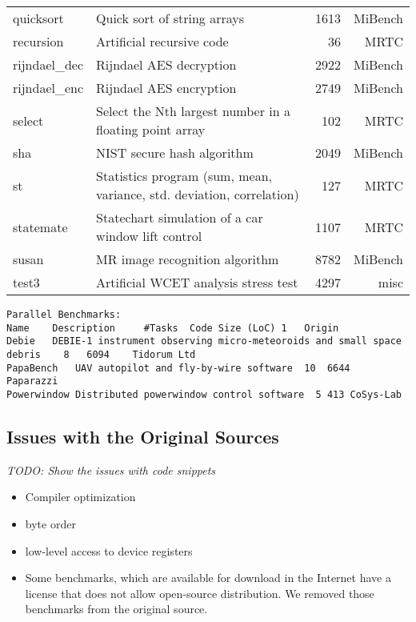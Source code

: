 \documentclass[a4paper,UKenglish]{oasics}
\newcommand{\todo}[1]{{\emph{TODO: #1}}}
\begin{document}
\begin{center}
\begin{longtable}{lp{5cm}rr}
    quicksort &  Quick sort of string arrays  & 1613 & MiBench \\
    recursion &  Artificial recursive code  & 36 & MRTC \\
    rijndael\_dec & Rijndael AES decryption  & 2922 & MiBench \\
    rijndael\_enc & Rijndael AES encryption  & 2749 & MiBench \\
    select & Select the Nth largest number in a floating point array  & 102 & MRTC \\
    sha &  NIST secure hash algorithm & 2049  & MiBench \\
    st & Statistics program (sum, mean, variance, std. deviation, correlation)  & 127  & MRTC \\
    statemate &  Statechart simulation of a car window lift control & 1107 & MRTC \\
    susan &  MR image recognition algorithm & 8782 & MiBench \\
    test3 &  Artificial WCET analysis stress test & 4297 & misc \\
\end{longtable}
\end{center}


\begin{verbatim}
Parallel Benchmarks:
Name 	Description 	#Tasks 	Code Size (LoC) 1 	Origin
Debie 	DEBIE-1 instrument observing micro-meteoroids and small space debris 	8 	6094 	Tidorum Ltd
PapaBench 	UAV autopilot and fly-by-wire software 	10 	6644 	Paparazzi
Powerwindow Distributed powerwindow control software  5 413	CoSys-Lab
\end{verbatim}


\subsection{Issues with the Original Sources}


\todo{Show the issues with code snippets}

\begin{itemize}
\item Compiler optimization
\item byte order
\item low-level access to device registers
\item Some benchmarks, which are available for download in the Internet have a license that
does not allow open-source distribution. We removed those benchmarks from the original source.
\end{itemize}
\end{document}
